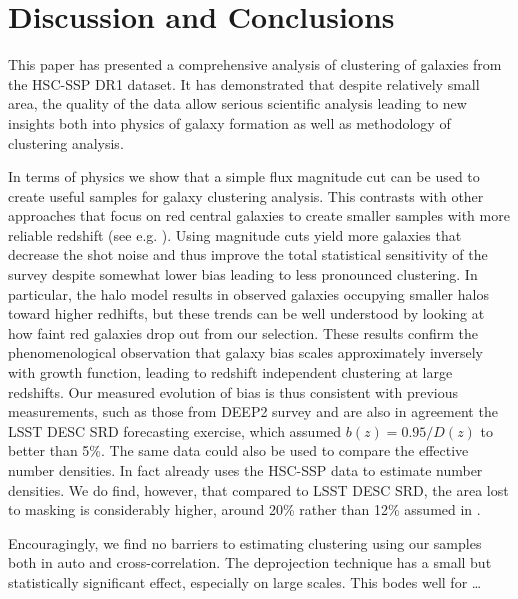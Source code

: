 \documentclass[a4paper,11pt]{article}
\begin{document}
\section{Discussion and Conclusions}\label{sec:discussion}

This paper has presented a comprehensive analysis of clustering of galaxies from the HSC-SSP DR1 dataset. It has demonstrated that despite relatively small area, the quality of the data allow serious scientific analysis leading to new insights both into physics of galaxy formation as well as methodology of clustering analysis.

In terms of physics we show that a simple flux magnitude cut can be used to create useful samples for galaxy clustering analysis. This contrasts with other approaches that focus on red central galaxies to create smaller samples with more reliable redshift (see e.g. \cite{1507.05460,1807.10163}). Using magnitude cuts yield more galaxies that decrease the shot noise and thus improve the total statistical sensitivity of the survey despite somewhat lower bias leading to less pronounced clustering. In particular, the halo model results in observed galaxies occupying smaller halos toward higher redhifts, but these trends can be well understood by looking at how faint red galaxies drop out from our selection. These results confirm the phenomenological observation that galaxy bias scales approximately inversely with growth function, leading to redshift independent clustering at large redshifts. Our measured evolution of bias is thus consistent with previous measurements, such as those from DEEP2 survey \cite{Coil:2004} and are also in agreement the LSST DESC SRD forecasting exercise, which assumed $b(z) = 0.95/D(z)$ \cite{1809.01669} to better than 5\%. The same data could also be used to compare the effective number densities. In fact \cite{1809.01669} already uses the HSC-SSP data to estimate number densities. We do find, however, that compared to LSST DESC SRD, the area lost to masking is considerably higher, around 20\% rather than 12\% assumed in \cite{1809.01669}.




Encouragingly, we find no barriers to estimating clustering using our samples both in auto and cross-correlation. The deprojection technique has a small but statistically significant effect, especially on large scales.  This bodes well for \ldots

\acknowledgments
\end{document}
